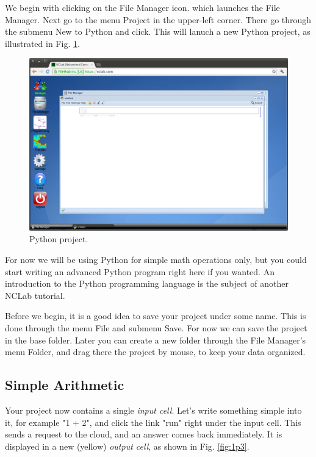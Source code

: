\documentclass[article,A4,12pt]{llncs}
\begin{document}
We begin with clicking on the File Manager icon. which launches the File 
Manager. Next go to the menu Project in the upper-left corner. There go 
through the submenu New to Python and click. This will lanuch a new Python 
project, as illustrated in Fig. \ref{fig:python}. 

\newpage

\begin{figure}[!ht]
\begin{center}
\includegraphics[width=\textwidth]{img/python.png}
\end{center}
\caption{Python project.}
\label{fig:python}
\end{figure}
\noindent
For now we will be using Python for simple math operations only,
but you could start writing an advanced Python program right 
here if you wanted. An introduction to the Python programming 
language is the subject of another NCLab tutorial.

Before we begin, it is a good idea to save your project under some 
name. This is done through the menu File and submenu Save. For 
now we can save the project in the base folder. Later you can create 
a new folder through the File Manager's menu Folder, and drag there
the project by mouse, to keep your data organized.

\subsection{Simple Arithmetic}

Your project now contains a single {\em input cell}. Let's write 
something simple into it, for example "1 + 2", and click 
the link "run" right under the input cell. This sends a request to 
the cloud, and an answer comes back immediately. It is displayed 
in a new (yellow) {\em output cell}, as shown in Fig. \ref{fig:1p3}.
\end{document}

